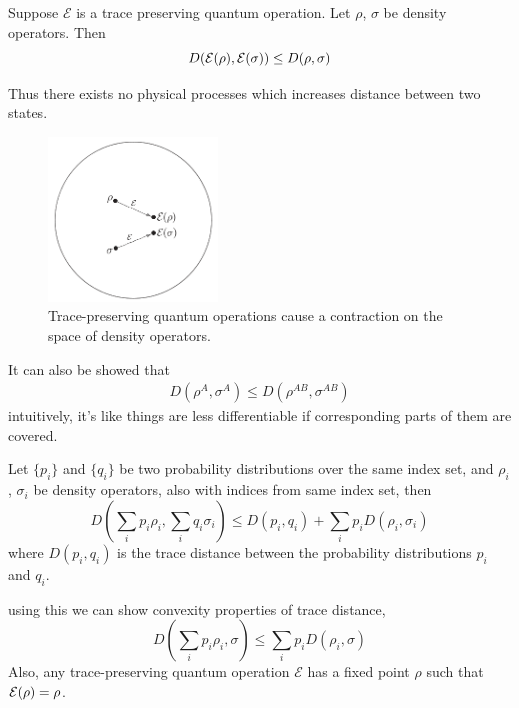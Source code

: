 \begin{theorem}
    Suppose $\mathcal{E}$ is a trace preserving quantum operation. Let $\rho$, $\sigma$ be density operators. Then
    \begin{equation}
        D(\operatorname{\mathcal{E}}(\rho), \operatorname{\mathcal{E}}(\sigma)) \leq D(\rho, \sigma)
    \end{equation}
\end{theorem}
Thus there exists no physical processes which increases distance between two states.
\begin{figure}[H]
    \centering
    \includegraphics[width=0.4\textwidth]{images/contraction_due_to_operation.png}
    \caption{Trace-preserving quantum operations cause a contraction on the space of density operators.}
    \label{fig:contraction_due_to_operation}
\end{figure}

It can also be showed that
\begin{align}
    D(\rho^A, \sigma^A) \leq D(\rho^{AB}, \sigma^{AB})
\end{align}
intuitively, it's  like things are less differentiable if corresponding parts of them are covered.

\begin{theorem}
    Let $\{ p_i \}$ and $\{ q_i \}$ be two probability distributions over the same index set, and $\rho_i$, $\sigma_i$ be density operators, also with indices from same index set, then
    \begin{equation}
        D\left( \sum_i p_i\rho_i, \sum_i q_i\sigma_i \right)
        \leq
        D(p_i, q_i) +
        \sum_i p_i D(\rho_i, \sigma_i)
    \end{equation}
    where $D(p_i, q_i)$ is the trace distance between the probability distributions $p_i$ and $q_i$.
\end{theorem}
using this we can show convexity properties of trace distance,
\begin{equation}
    D\left( \sum_i p_i\rho_i , \sigma \right)
    \leq
    \sum_i p_iD(\rho_i, \sigma)
\end{equation}
Also, any trace-preserving quantum operation $\mathcal{E}$ has a fixed point $\rho$ such that $\operatorname{\mathcal{E}}(\rho) = \rho$.

